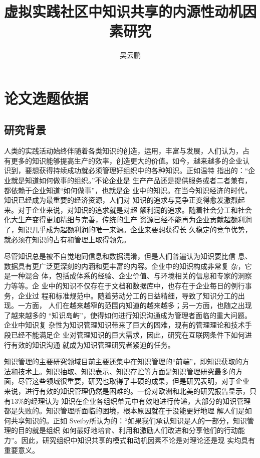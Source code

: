 \documentclass[12pt,a4paper]{ctexart}
\begin{document}
  \title{虚拟实践社区中知识共享的内源性动机因
      素研究 }
  \author {吴云鹏}
   \maketitle
 \newpage
  \tableofcontents



\newpage
  \section{论文选题依据}

  \subsection{研究背景}
人类的实践活动始终伴随着各类知识的创造，运用，丰富与发展，人们认为，占
有更多的知识能够提高生产的效率，创造更大的价值。如今，越来越多的企业认
识到，要想获得持续成功就必须管理好组织中的各种知识。正如温特
\cite{Williamson1994}指出的：“企业就是知道如何做事的组织。”不论企业是
生产产品还是提供服务或者二者兼有，都依赖于企业知道“如何做事”，也就是企
业中的知识。在当今知识经济的时代，知识已经成为最重要的经济资源，人们对
知识的追求与竞争正变得愈发激烈起来。对于企业来说，对知识的追求就是对超
额利润的追求。随着社会分工和社会化大生产变得更加精细与完善，传统的生产
资源已经不能再为企业贡献超额利润了，知识几乎成为超额利润的唯一来源。企业来要想获得长
久稳定的竞争优势，就必须在知识的占有和管理上取得领先。

尽管知识总是被不自觉地同信息和数据混淆，但是人们普遍认为知识要比信
息、数据具有更广泛更深刻的内涵和更丰富的内容。企业中的知识构成非常复
杂，它是一种混合
体，包括成体系的经验、企业价值、与环境相关的信息和专家的洞察力等等。企
业中的知识不仅存在于文档和数据库中，也存在于企业每日的例行事务，企业过
程和标准规范中。随着劳动分工的日益精细，导致了知识分工的出现。一方面，
人们在越来越窄的范围内知道的越来越多；另一方面，也随之出现了越来越多的
“知识岛屿”，使得如何进行知识沟通成为管理者面临的重大问题。企业中知识复
杂性为知识管理知识带来了巨大的困难，现有的管理理论和技术手段已经不能满足企
业对管理知识的巨大需求，因此，研究在互联网条件下如何进行有效的知识沟通
就成为知识管理研究者紧迫的任务。

知识管理的主要研究领域目前主要还集中在知识管理的“前端”，即知识获取的方
法和技术上。知识抽取、知识表示、知识存贮等方面是知识管理研究最多的方
面，尽管这些领域很重要，研究也取得了丰硕的成果，但是研究表明，对于企业
来说，进行有效的知识管理仍然是困难的。一份对欧洲和北美的研究报告显示，只有13\%的经理认为
知识在企业各组织单元中有效地进行传递，大部分的知识管理都是失败的\cite{Ruggles1998}。知识管理所面临的困境，根本原因就在于没能更好地理
解人们是如何共享知识的。正如
Sveiby所认为的：“如果我们承认知识是人的一部分，知识管理的目的就是组织
如何最好地培育、利用和激励人们改进和分享他们的行动能
力”\cite{Seviby1997}。因此，研究组织中知识共享的模式和动机因素不论是对理论还是现
实均具有重要意义。
\end{document}
